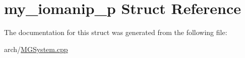 \hypertarget{structmy__iomanip__p}{\section{my\+\_\+iomanip\+\_\+p Struct Reference}
\label{structmy__iomanip__p}
}


The documentation for this struct was generated from the following file\+:\begin{DoxyCompactItemize}
\item 
arch/\hyperlink{_m_g_system_8cpp}{M\+G\+System.\+cpp}\end{DoxyCompactItemize}
